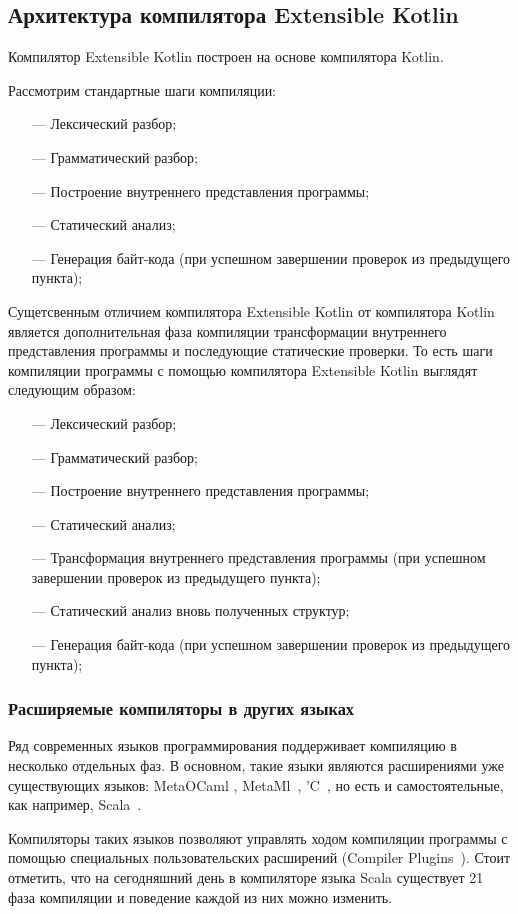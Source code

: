 \subsection{Архитектура компилятора Extensible Kotlin}
Компилятор Extensible Kotlin построен на основе компилятора Kotlin.

Рассмотрим стандартные шаги компиляции:
\begin{itemize}
\item[---] Лексический разбор;
\item[---] Грамматический разбор;
\item[---] Построение внутреннего представления программы;
\item[---] Статический анализ; \td
\item[---] Генерация байт-кода (при успешном завершении проверок из предыдущего пункта);
\end{itemize}

Сущетсвенным отличием компилятора Extensible Kotlin от компилятора Kotlin является дополнительная фаза компиляции трансформации внутреннего представления программы  и последующие статические проверки. То есть шаги компиляции программы с помощью компилятора Extensible Kotlin выглядят следующим образом:
\begin{itemize}
\item[---] Лексический разбор;
\item[---] Грамматический разбор;
\item[---] Построение внутреннего представления программы;
\item[---] Статический анализ; \td
\item[---] Трансформация внутреннего представления программы (при успешном завершении проверок из предыдущего пункта);
\item[---] Статический анализ вновь полученных структур; \td
\item[---] Генерация байт-кода (при успешном завершении проверок из предыдущего пункта);
\end{itemize}

\subsubsection{Расширяемые компиляторы в других языках} %
Ряд современных языков программирования поддерживает компиляцию в несколько отдельных фаз.
В основном, такие языки являются расширениями уже существующих языков: MetaOCaml \td, MetaMl~\cite{metaml}, 'C~\cite{extendible-c}, но есть и самостоятельные, как например, Scala~\cite{scala-spec}. 

Компиляторы таких языков позволяют управлять ходом компиляции программы с помощью специальных пользовательских расширений (Compiler Plugins~\cite{scala-compiler-plugin}). Стоит отметить, что на сегодняшний день в компиляторе языка Scala существует 21 фаза компиляции и поведение каждой из них можно изменить.

